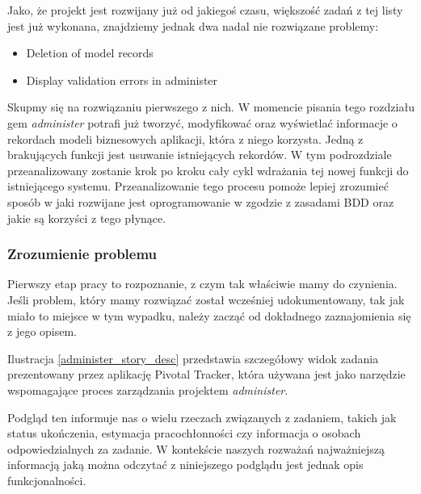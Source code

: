     Jako, że projekt jest rozwijany już od jakiegoś czasu, większość zadań z tej listy jest już wykonana, znajdziemy jednak dwa nadal nie rozwiązane problemy:
    
    \begin{itemize}
      \item Deletion of model records
      \item Display validation errors in administer
    \end{itemize}
    
    Skupmy się na rozwiązaniu pierwszego z nich. W momencie pisania tego rozdziału gem \emph{administer} potrafi już tworzyć, modyfikować oraz wyświetlać informacje o rekordach modeli biznesowych aplikacji, która z niego korzysta. Jedną z brakujących funkcji jest usuwanie istniejących rekordów. W tym podrozdziale przeanalizowany zostanie krok po kroku cały cykl wdrażania tej nowej funkcji do istniejącego systemu. Przeanalizowanie tego procesu pomoże lepiej zrozumieć sposób w jaki rozwijane jest oprogramowanie w zgodzie z zasadami BDD oraz jakie są korzyści z tego płynące.
    
    \subsubsection{Zrozumienie problemu}
    Pierwszy etap pracy to rozpoznanie, z czym tak właściwie mamy do czynienia. Jeśli problem, który mamy rozwiązać został wcześniej udokumentowany, tak jak miało to miejsce w tym wypadku, należy zacząć od dokładnego zaznajomienia się z jego opisem.
    
    Ilustracja \ref{administer_story_desc} przedstawia szczegółowy widok zadania prezentowany przez aplikację Pivotal Tracker, która używana jest jako narzędzie wspomagające proces zarządzania projektem \emph{administer}.
    
    Podgląd ten informuje nas o wielu rzeczach związanych z zadaniem, takich jak status ukończenia, estymacja pracochłonności czy informacja o osobach odpowiedzialnych za zadanie. W kontekście naszych rozważań najważniejszą informacją jaką można odczytać z niniejszego podglądu jest jednak opis funkcjonalności. 
    
